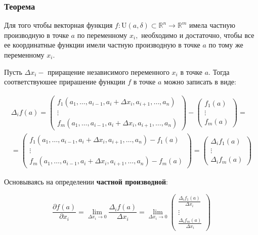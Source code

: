 \subsubsection{Теорема}

Для того чтобы векторная функция
\(f: \mathrm{U}(a, \delta) \subset \mathbb{R}^{n} \rightarrow \mathbb{R}^{m}\)
имела частную производную в точке \(a\) по переменному \(x_{i},\)
необходимо и достаточно, чтобы все ее координатные функции имели частную
производную в точке \(a\) по тому же переменному \(x_{i}\).

Пусть \(\Delta x_{i}-\) приращение независимого переменного \(x_{i}\) в
точке \(a .\) Тогда соответствуюшее прирашение функции \(f\) в точке
\(a\) можно записать в виде:

\[\begin{array}{c}
\Delta_{i} f(a)=\left(\begin{array}{c}
f_{1}\left(a_{1}, \ldots, a_{i-1}, a_{i}+\Delta x_{i}, a_{i+1}, \ldots, a_{n}\right) \\
\vdots \\
f_{m}\left(a_{1}, \ldots, a_{i-1}, a_{i}+\Delta x_{i}, a_{i+1}, \ldots, a_{n}\right)
\end{array}\right)-\left(\begin{array}{c}
f_{1}(a) \\
\vdots \\
f_{m}(a)
\end{array}\right)= \\
=\left(\begin{array}{c}
f_{1}\left(a_{1}, \ldots, a_{i-1}, a_{i}+\Delta x_{i}, a_{i+1}, \ldots, a_{n}\right)-f_{1}(a) \\
\vdots \\
f_{m}\left(a_{1}, \ldots, a_{i-1}, a_{i}+\Delta x_{i}, a_{i+1}, \ldots, a_{n}\right)-f_{m}(a)
\end{array}\right)=\left(\begin{array}{c}
\Delta_{i} f_{1}(a) \\
\vdots \\
\Delta_{i} f_{m}(a)
\end{array}\right)
\end{array}\]

Основываясь на определении \textbf{частной производной}:

\[\frac{\partial f(a)}{\partial x_{i}}=\lim _{\Delta x_{i} \rightarrow 0} \frac{\Delta_{i} f(a)}{\Delta x_{i}}=\lim _{\Delta x_{i} \rightarrow 0}\left(\begin{array}{c}
\frac{\Delta_{i} f_{1}(a)}{\Delta x_{i}} \\
\vdots \\
\frac{\Delta_{i} f_{m}(a)}{\Delta x_{i}}
\end{array}\right)\]

